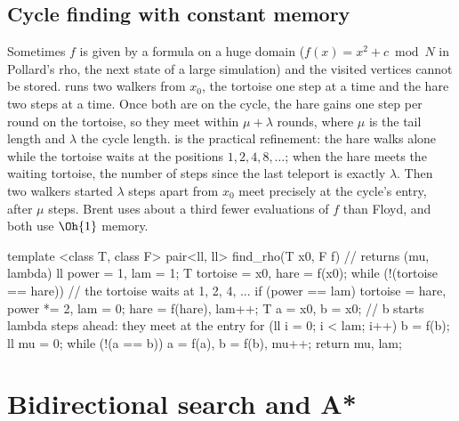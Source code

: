 

\subsection{Cycle finding with constant memory}

Sometimes $f$ is given by a formula on a huge domain ($f(x) = x^2 + c \bmod N$ in Pollard's rho, the next state of a large
simulation) and the visited vertices cannot be stored.  runs two walkers from $x_0$, the
tortoise one step at a time and the hare two steps at a time. Once both are on the cycle, the hare gains one step per round on
the tortoise, so they meet within $\mu + \lambda$ rounds, where $\mu$ is the tail length and $\lambda$ the cycle length.
 is the practical refinement: the hare walks alone while the tortoise waits at the positions
$1, 2, 4, 8, \ldots$; when the hare meets the waiting tortoise, the number of steps since the last teleport is exactly
$\lambda$. Then two walkers started $\lambda$ steps apart from $x_0$ meet precisely at the cycle's entry, after $\mu$ steps.
Brent uses about a third fewer evaluations of $f$ than Floyd, and both use $\Oh{1}$ memory.

\begin{code}
template <class T, class F>
pair<ll, ll> find_rho(T x0, F f) {  // returns (mu, lambda)
    ll power = 1, lam = 1;
    T tortoise = x0, hare = f(x0);
    while (!(tortoise == hare)) {  // the tortoise waits at 1, 2, 4, ...
        if (power == lam) tortoise = hare, power *= 2, lam = 0;
        hare = f(hare), lam++;
    }
    T a = x0, b = x0;  // b starts lambda steps ahead: they meet at the entry
    for (ll i = 0; i < lam; i++) b = f(b);
    ll mu = 0;
    while (!(a == b)) a = f(a), b = f(b), mu++;
    return {mu, lam};
}
\end{code}


\section[Bidirectional search and A*]{Bidirectional search and A* \hfill \ioi}\label{sec:bibfs}


